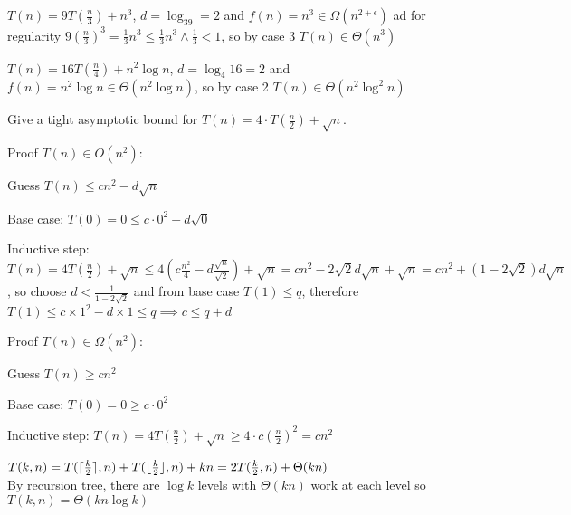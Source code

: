 \documentclass[12pt, a4paper]{article}
\begin{document}
\begin{enumerate}[Q\arabic*).]
  \item $T(n) = 9T(\frac{n}{3}) + n^3$, $d = \log_39 = 2$ and $f(n) = n^3 \in \Omega(n^{2+\epsilon})$ ad for regularity $9(\frac{n}{3})^3 = \frac{1}{3}n^3 \leq \frac{1}{3}n^3 \land \frac{1}{3}<1$, so by case 3 $T(n) \in \Theta(n^3)$

  \item $T(n) = 16T(\frac{n}{4}) + n^2\log n$, $d = \log_4{16} = 2$ and $f(n) = n^2\log n \in \Theta(n^2\log n)$, so by case 2 $T(n) \in \Theta(n^2\log^2n)$

  \item Give a tight asymptotic bound for $T(n) = 4\cdot T(\frac{n}{2}) + \sqrt n$.
    \begin{enumproof}
    \item Proof $T(n)\in O(n^2)$:
      \begin{enumproof}
      \item Guess $T(n) \leq cn^2 -d\sqrt n$ 
      \item Base case: $T(0) = 0 \leq c \cdot 0^2 - d \sqrt{0}$
      \item Inductive step: $T(n) = 4T(\frac{n}{2}) + \sqrt n \leq 4(c \frac{n^2}{4} - d \frac{\sqrt n}{\sqrt 2}) + \sqrt n = cn^2-2\sqrt 2 d\sqrt n + \sqrt n = cn^2 + (1-2\sqrt 2)d\sqrt n$, so choose $d <\frac{1}{1-2\sqrt{2}}$ and from base case $T(1) \leq q$, therefore $T(1) \leq c \times 1^2 - d\times 1 \leq q \implies c \leq q + d$
      \end{enumproof}
    \item Proof $T(n)\in \Omega(n^2)$:
      \begin{enumproof}
      \item Guess $T(n) \geq cn^2$
      \item Base case: $T(0) = 0 \geq c \cdot 0^2$
      \item Inductive step: $T(n) = 4T(\frac{n}{2}) + \sqrt n \geq 4\cdot c(\frac{n}{2})^2 = cn^2$
      \end{enumproof}
    \end{enumproof}

  \item $T(k, n) = T(\lceil \frac{k}{2} \rceil, n) + T(\lfloor \frac{k}{2} \rfloor, n) + kn = 2T(\frac{k}{2}, n) + \Theta(kn)$\\
    By recursion tree, there are $\log k$ levels with $\Theta(kn)$ work at each level so $T(k, n) = \Theta(kn\log k)$

\end{enumerate}
\end{document}
